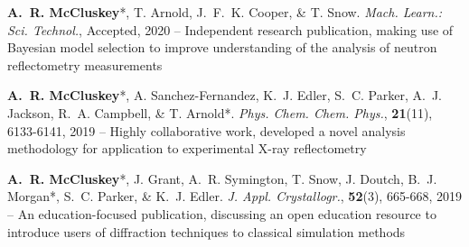 \begin{cventriesy}
  \cventryy
    {
      \begin{cvitemsy}
        \item {\textbf{A.~R. McCluskey}*, T. Arnold, J.~F.~K. Cooper, \& T. Snow. \emph{Mach. Learn.: Sci. Technol.}, Accepted, 2020 -- Independent research publication, making use of Bayesian model selection to improve understanding of the analysis of neutron reflectometry measurements}
    \vspace{1mm}
        \item {\textbf{A.~R. McCluskey}*, A. Sanchez-Fernandez, K.~J. Edler, S.~C. Parker, A.~J. Jackson, R.~A. Campbell, \& T. Arnold*. \emph{Phys. Chem. Chem. Phys.}, \textbf{21}(11), 6133-6141, 2019 -- Highly collaborative work, developed a novel analysis methodology for application to experimental X-ray reflectometry}
    \vspace{1mm}
        \item {\textbf{A.~R. McCluskey}*, J. Grant, A.~R. Symington, T. Snow, J. Doutch, B.~J. Morgan*, S.~C. Parker, \& K.~J. Edler. \emph{J. Appl. Crystallogr.}, \textbf{52}(3), 665-668, 2019 -- An education-focused publication, discussing an open education resource to introduce users of diffraction techniques to classical simulation methods} 
      \end{cvitemsy}
    }
\end{cventriesy}
